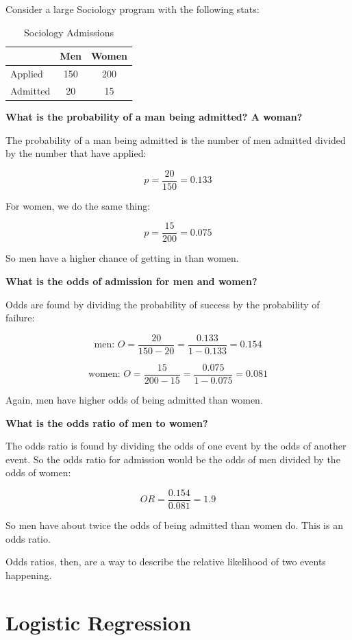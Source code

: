 \documentclass[12pt]{amsart}
\begin{document}
Consider a large Sociology program with the following stats:

\begin{table}[htb]
\caption{Sociology Admissions\label{tab:admin}}
\begin{tabular}{l c c}
\hline
& Men & Women\\ \hline
Applied & 150 & 200\\
Admitted & 20 & 15\\
\hline
\end{tabular}
\end{table}

\textbf{What is the probability of a man being admitted? A woman?}

The probability of a man being admitted is the number of men admitted divided by the number that have applied:

\[ p = \frac{20}{150} = 0.133 \]

For women, we do the same thing:

\[ p = \frac{15}{200} = 0.075 \]

So men have a higher chance of getting in than women.

\textbf{What is the odds of admission for men and women?}

Odds are found by dividing the probability of success by the probability of failure:

\[ \text{men: } O = \frac{20}{150-20} = \frac{0.133}{1-0.133} = 0.154 \]

\[ \text{women: } O = \frac{15}{200-15} = \frac{0.075}{1-0.075} =  0.081 \]

Again, men have higher odds of being admitted than women.

\textbf{What is the odds ratio of men to women?}

The odds ratio is found by dividing the odds of one event by the odds of another event. So the odds ratio for admission would be the odds of men divided by the odds of women:

\[ OR = \frac{0.154}{0.081} = 1.9 \]

So men have about twice the odds of being admitted than women do. This is an odds ratio.

Odds ratios, then, are a way to describe the relative likelihood of two events happening. 

\section{Logistic Regression}
\end{document}
